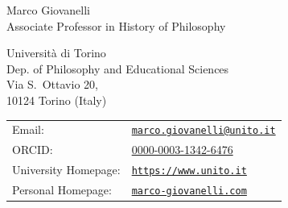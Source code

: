 \documentclass{article}
\def\name{Marco Giovanelli}
\begin{document}
{\huge \name\small \\ Associate Professor in History of Philosophy}


\vspace{0.25in}


\begin{minipage}{0.45\linewidth}
 Università di Torino\\
 Dep. of Philosophy and Educational Sciences\\
  Via S.\ Ottavio 20,\\ 
    10124 Torino (Italy)
   
\end{minipage}
\begin{minipage}{0.45\linewidth}
  \begin{tabular}{ll}
    Email: & \href{mailto:marco.giovanelli@unito.it}{\tt marco.giovanelli@unito.it} \\ ORCID:  & \href{https://orcid.org/0000-0003-1342-6476}{0000-0003-1342-6476}\\
    University Homepage: & \href{https://www.dfe.unito.it/do/docenti.pl/Show?_id=mgiovane}{\tt https://www.unito.it} \\ Personal Homepage: & \href{http://marco-giovanelli.com}{\tt marco-giovanelli.com} \\
  \end{tabular}
\end{minipage}
\end{document}
